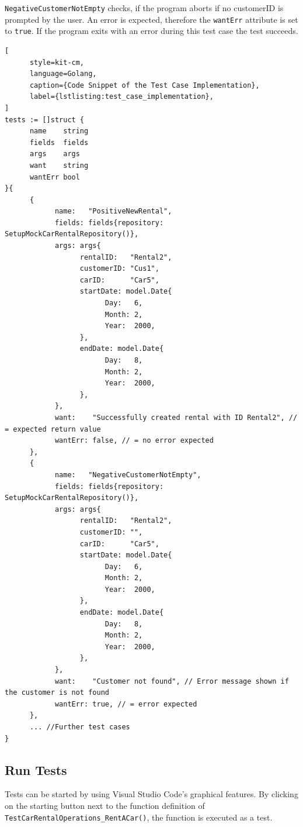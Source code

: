 \texttt{NegativeCustomerNotEmpty} checks, if the program aborts if no customerID is prompted by the user.
An error is expected, therefore the \texttt{wantErr} attribute is set to \texttt{true}.
If the program exits with an error during this test case the test succeeds.

\begin{lstlisting}[
      style=kit-cm,
      language=Golang,
      caption={Code Snippet of the Test Case Implementation},
      label={lstlisting:test_case_implementation},
]
tests := []struct {
      name    string
      fields  fields
      args    args
      want    string
      wantErr bool
}{
      {
            name:   "PositiveNewRental",
            fields: fields{repository: SetupMockCarRentalRepository()},
            args: args{
                  rentalID:   "Rental2",
                  customerID: "Cus1",
                  carID:      "Car5",
                  startDate: model.Date{
                        Day:   6,
                        Month: 2,
                        Year:  2000,
                  },
                  endDate: model.Date{
                        Day:   8,
                        Month: 2,
                        Year:  2000,
                  },
            },
            want:    "Successfully created rental with ID Rental2", // = expected return value
            wantErr: false, // = no error expected 
      },
      {
            name:   "NegativeCustomerNotEmpty",
            fields: fields{repository: SetupMockCarRentalRepository()},
            args: args{
                  rentalID:   "Rental2",
                  customerID: "",
                  carID:      "Car5",
                  startDate: model.Date{
                        Day:   6,
                        Month: 2,
                        Year:  2000,
                  },
                  endDate: model.Date{
                        Day:   8,
                        Month: 2,
                        Year:  2000,
                  },
            },
            want:    "Customer not found", // Error message shown if the customer is not found
            wantErr: true, // = error expected
      },
      ... //Further test cases
}
\end{lstlisting}

\subsection*{Run Tests}
Tests can be started by using Visual Studio Code's graphical features.
By clicking on the starting button next to the function definition of \texttt{TestCarRentalOperations\_RentACar()}, the function is executed as a test.

